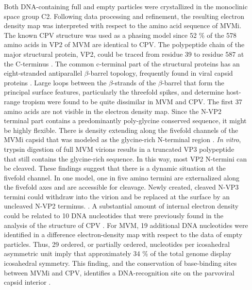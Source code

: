 Both DNA-containing full and empty particles were crystallized in the monoclinic space group C2. Following data processing and refinement, the resulting electron density map was interpreted with respect to the amino acid sequence of MVMi. The known CPV structure was used as a phasing model since 52 \% of the 578 amino acids in VP2 of MVM are identical to CPV. The polypeptide chain of the major structural protein, VP2, could be traced from residue 39 to residue 587 at the C-terminus \cite{pmid15299974}.     
The common c-terminal part of the structural proteins has an eight-stranded antiparallel $\beta$-barrel topology, frequently found in viral capsid proteins \cite{pmid2673017}. Large loops between the $\beta$-strands of the $\beta$-barrel that form the principal surface features, particularly the threefold spikes, and determine host-range tropism were found to be quite dissimilar in MVM and CPV. 
The first 37 amino acids are not visible in the electron density map. Since the N-VP2 terminal part contains a predominantly poly-glycine conserved sequence, it might be highly flexible. There is density extending along the fivefold channels of the MVMi capsid that was modeled as the glycine-rich N-terminal region \cite{pmid15299494, pmid8969301}. \textit{In vitro}, trypsin digestion of full MVM virions results in a truncated VP3 polypeptide that still contains the glycine-rich sequence. In this way, most VP2 N-termini can be cleaved. These findings suggest that there is a dynamic situation at the fivefold channel. In one model, one in five amino termini are externalized along the fivefold axes and are accessible for cleavage. Newly created, cleaved N-VP3 termini could withdraw into the virion and be replaced at the surface by an uncleaved N-VP2 terminus. \cite{pmid8503170, pmid9817841}.
A substantial amount of internal electron density could be related to 10 DNA nucleotides that were previously found in the analysis of the structure of CPV \cite{pmid7735832, pmid1616694}. For MVM, 19 additional DNA nucleotides were identified in a difference electron-density map with respect to the data of empty particles. Thus, 29 ordered, or partially ordered, nucleotides per icosahedral asymmetric unit imply that approximately 34 \% of the total genome display icosahedral symmetry. This finding, and the conservation of base-binding sites between MVMi and CPV, identifies a DNA-recognition site on the parvoviral capsid interior \cite{pmid9817841}.    









